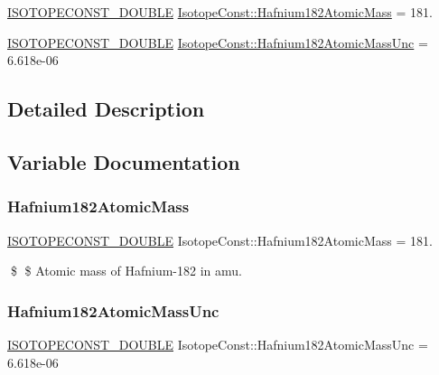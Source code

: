 \begin{DoxyCompactItemize}
\item 
\mbox{\hyperlink{group___isotope_const-_macros_ga8f45a7272ce02c0b4c65c44636ed719a}{I\+S\+O\+T\+O\+P\+E\+C\+O\+N\+S\+T\+\_\+\+D\+O\+U\+B\+LE}} \mbox{\hyperlink{group___isotope_const-_hafnium-_hf182_gaaab7a6c9dfa4dda9f925d3e530aba336}{Isotope\+Const\+::\+Hafnium182\+Atomic\+Mass}} = 181.
\item 
\mbox{\hyperlink{group___isotope_const-_macros_ga8f45a7272ce02c0b4c65c44636ed719a}{I\+S\+O\+T\+O\+P\+E\+C\+O\+N\+S\+T\+\_\+\+D\+O\+U\+B\+LE}} \mbox{\hyperlink{group___isotope_const-_hafnium-_hf182_ga4a89ebf867ac6bf5d65bad0cd14220dc}{Isotope\+Const\+::\+Hafnium182\+Atomic\+Mass\+Unc}} = 6.\+618e-\/06
\end{DoxyCompactItemize}


\subsection{Detailed Description}


\subsection{Variable Documentation}
\mbox{\label{group___isotope_const-_hafnium-_hf182_gaaab7a6c9dfa4dda9f925d3e530aba336}} 
\subsubsection{\texorpdfstring{Hafnium182\+Atomic\+Mass}{Hafnium182AtomicMass}}
{\footnotesize\ttfamily \mbox{\hyperlink{group___isotope_const-_macros_ga8f45a7272ce02c0b4c65c44636ed719a}{I\+S\+O\+T\+O\+P\+E\+C\+O\+N\+S\+T\+\_\+\+D\+O\+U\+B\+LE}} Isotope\+Const\+::\+Hafnium182\+Atomic\+Mass = 181.}

\$ \$ Atomic mass of Hafnium-\/182 in amu. \mbox{\label{group___isotope_const-_hafnium-_hf182_ga4a89ebf867ac6bf5d65bad0cd14220dc}} 
\subsubsection{\texorpdfstring{Hafnium182\+Atomic\+Mass\+Unc}{Hafnium182AtomicMassUnc}}
{\footnotesize\ttfamily \mbox{\hyperlink{group___isotope_const-_macros_ga8f45a7272ce02c0b4c65c44636ed719a}{I\+S\+O\+T\+O\+P\+E\+C\+O\+N\+S\+T\+\_\+\+D\+O\+U\+B\+LE}} Isotope\+Const\+::\+Hafnium182\+Atomic\+Mass\+Unc = 6.\+618e-\/06}

